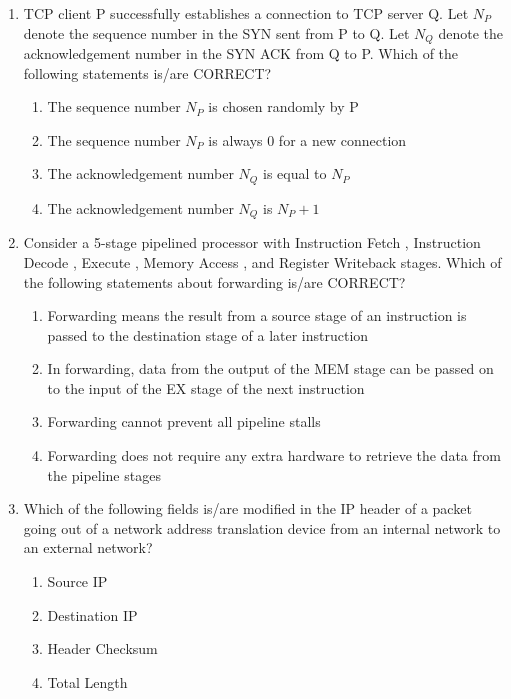 \documentclass[a4paper, 11pt]{article}
\begin{document}
\begin{enumerate}
    \item TCP client P successfully establishes a connection to TCP server Q. Let $N_P$ denote the sequence number in the SYN sent from P to Q. Let $N_Q$ denote the acknowledgement number in the SYN ACK from Q to P. Which of the following statements is/are CORRECT?
    \begin{enumerate}
        \item The sequence number $N_P$ is chosen randomly by P
        \item The sequence number $N_P$ is always 0 for a new connection
        \item The acknowledgement number $N_Q$ is equal to $N_P$
        \item The acknowledgement number $N_Q$ is $N_P + 1$
    \end{enumerate}
    \hfill{}

    \item Consider a 5-stage pipelined processor with Instruction Fetch , Instruction Decode , Execute , Memory Access , and Register Writeback  stages. Which of the following statements about forwarding is/are CORRECT?
    \begin{enumerate}
        \item Forwarding means the result from a source stage of an instruction is passed to the destination stage of a later instruction
        \item In forwarding, data from the output of the MEM stage can be passed on to the input of the EX stage of the next instruction
        \item Forwarding cannot prevent all pipeline stalls
        \item Forwarding does not require any extra hardware to retrieve the data from the pipeline stages
    \end{enumerate}
    \hfill{}

    \item Which of the following fields is/are modified in the IP header of a packet going out of a network address translation  device from an internal network to an external network?
    \begin{enumerate}
        \item Source IP
        \item Destination IP
        \item Header Checksum
        \item Total Length
    \end{enumerate}
    \hfill{}


\end{enumerate}
\end{document}

